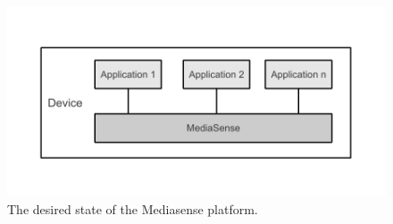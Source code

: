 \begin{figure}[h!]
	\centering
    	\includegraphics[scale=0.75]{part_4/result_and_analysis/mediasense_arch_new.pdf}
    	\centering
		\caption{The desired state of the Mediasense platform.}
       \label{fig1}
\end{figure}
